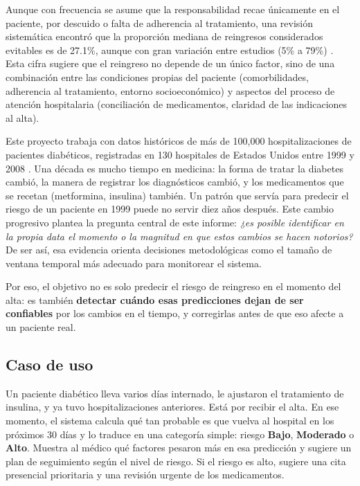 \documentclass[11pt,a4paper]{article}
\begin{document}
Aunque con frecuencia se asume que la responsabilidad recae únicamente en el paciente, por descuido o falta de adherencia al tratamiento, una revisión sistemática encontró que la proporción mediana de reingresos considerados evitables es de 27.1\%, aunque con gran variación entre estudios (5\% a 79\%) \cite{vanwalraven2011}. Esta cifra sugiere que el reingreso no depende de un único factor, sino de una combinación entre las condiciones propias del paciente (comorbilidades, adherencia al tratamiento, entorno socioeconómico) y aspectos del proceso de atención hospitalaria (conciliación de medicamentos, claridad de las indicaciones al alta).

Este proyecto trabaja con datos históricos de más de 100,000 hospitalizaciones de pacientes diabéticos, registradas en 130 hospitales de Estados Unidos entre 1999 y 2008 \cite{strack2014}. Una década es mucho tiempo en medicina: la forma de tratar la diabetes cambió, la manera de registrar los diagnósticos cambió, y los medicamentos que se recetan (metformina, insulina) también. Un patrón que servía para predecir el riesgo de un paciente en 1999 puede no servir diez años después. Este cambio progresivo plantea la pregunta central de este informe: \emph{¿es posible identificar en la propia data el momento o la magnitud en que estos cambios se hacen notorios?} De ser así, esa evidencia orienta decisiones metodológicas como el tamaño de ventana temporal más adecuado para monitorear el sistema.

Por eso, el objetivo no es solo predecir el riesgo de reingreso en el momento del alta: es también \textbf{detectar cuándo esas predicciones dejan de ser confiables} por los cambios en el tiempo, y corregirlas antes de que eso afecte a un paciente real.

\subsection{Caso de uso}

Un paciente diabético lleva varios días internado, le ajustaron el tratamiento de insulina, y ya tuvo hospitalizaciones anteriores. Está por recibir el alta. En ese momento, el sistema calcula qué tan probable es que vuelva al hospital en los próximos 30 días y lo traduce en una categoría simple: riesgo \textbf{Bajo}, \textbf{Moderado} o \textbf{Alto}. Muestra al médico qué factores pesaron más en esa predicción y sugiere un plan de seguimiento según el nivel de riesgo. Si el riesgo es alto, sugiere una cita presencial prioritaria y una revisión urgente de los medicamentos.
\end{document}
